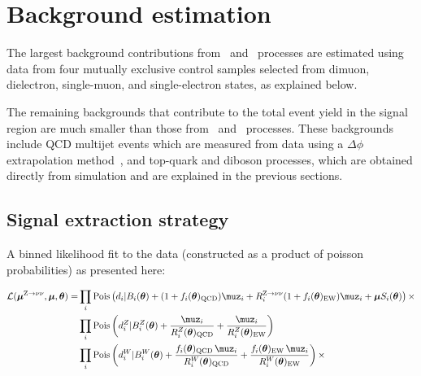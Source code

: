 \section{Background estimation} \label{sec:bkg}

The largest background contributions from \Zvvjets~and \Wlvjets~processes
are estimated using data from four mutually exclusive control samples selected 
from dimuon, dielectron, single-muon, and single-electron states, 
as explained below. 

The remaining backgrounds that contribute to the total event yield in the signal region
are much smaller than those from \Zvvjets~and \Wlvjets~processes. These backgrounds
include QCD multijet events which are measured from data using a $\Delta\phi$ extrapolation 
method~\cite{Collaboration:2011ida,paper-exo-037}, and top-quark and diboson processes, which are 
obtained directly from simulation and are explained in the previous sections. 

\subsection{Signal extraction strategy}

A binned likelihood fit to the data (constructed as a product of poisson probabilities) as presented here:

\begingroup
\small
\begin{align}
\mathcal{L}(\boldsymbol{\mu}^{\Zvv}, \boldsymbol{\mu}, \boldsymbol{\theta}) = &
\prod_{i} \mathrm{Pois}\left(d_{i} | B_{i}(\boldsymbol{\theta}) + (1+f_{i}(\boldsymbol{\theta})_{\mathrm{QCD}}) \muz_{i} + R^{\mathrm{\Zvv}}_{i} (1+f_{i}(\boldsymbol{\theta})_{\mathrm{EW}}) \muz_{i}+ \boldsymbol{\mu} S_{i}(\boldsymbol{\theta})\right ) \times \nonumber\\
&\prod_{i} \mathrm{Pois} \left(d^{Z}_{i}|B^{Z}_{i}(\boldsymbol{\theta}) +\frac{\muz_{i} }{R^{Z}_{i} (\boldsymbol{\theta})_{\mathrm{QCD}}} + \frac{\muz_{i} }{R^{Z}_{i} (\boldsymbol{\theta})_{\mathrm{EW}}} \right) \nonumber\\
& \prod_{i} \mathrm{Pois}\left(d^{W}_{i}|B^{W}_{i}(\boldsymbol{\theta}) +\frac{f_{i}(\boldsymbol{\theta})_{\mathrm{QCD}}\,\muz_{i}}{R^{W}_{i}(\boldsymbol{\theta})_{\mathrm{QCD}}}+\frac{f_{i}(\boldsymbol{\theta})_{\mathrm{EW}}\,\muz_{i} }{R^{W}_{i} (\boldsymbol{\theta})_{\mathrm{EW}}} \right) \times \nonumber\\
\end{align}
\endgroup

